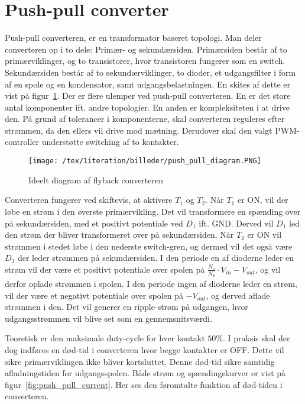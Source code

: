 \section{Push-pull converter}
Push-pull converteren, er en transformator baseret topologi. Man deler converteren op i to dele: Primær- og sekundærsiden. Primærsiden består af to primærviklinger, og to transistorer, hvor transistoren fungerer som en switch. Sekundærsiden består af to sekundærviklinger, to dioder, et udgangsfilter i form af en spole og en kondensator, samt udgangsbelastningen. En skites af dette er vist på figur~\ref{fig:push_pull_ideal}. Der er flere ulemper ved push-pull converteren. En er det store antal komponenter ift. andre topologier. En anden er kompleksiteten i at drive den. På grund af tolerancer i komponenterne, skal converteren reguleres efter strømmen, da den ellers vil drive mod mætning. Derudover skal den valgt PWM-controller understøtte switching af to kontakter. 

\begin{figure}[H]
	\center
	\texttt{[image: /tex/1iteration/billeder/push\_pull\_diagram.PNG]}
	\caption{Ideelt diagram af flyback converteren
		\cite{SMPS-topologies}}
	\label{fig:push_pull_ideal}
\end{figure} 

\noindent Converteren fungerer ved skiftevis, at aktivere $T_1$ og $T_2$. Når $T_1$ er ON, vil der løbe en strøm i den øverste primærvikling. Det vil transformere en spænding over på sekundærsiden, med et positivt potentiale ved $D_1$ ift. GND. Derved vil $D_1$ led den strøm der bliver transformeret over på sekundærsiden. Når $T_2$ er ON vil strømmen i stedet løbe i den nederste switch-gren, og dermed vil det også være $D_2$ der leder strømmen på sekundærsiden. I den periode en af dioderne leder en strøm vil der være et positivt potentiale over spolen på $\frac{N_s}{N_p} \cdot V_{in} - V_{out}$, og vil derfor oplade strømmen i spolen. I den periode ingen af dioderne leder en strøm, vil der være et negativt potentiale over spolen på $-V_{out}$, og derved aflade strømmen i den. Det vil generer en ripple-strøm på udgangen, hvor udgangsstrømmen vil blive set som en gennemsnitsværdi. 

Teoretisk er den maksimale duty-cycle for hver kontakt $50\percent$. I praksis skal der dog indføres en død-tid i converteren hvor begge kontakter er OFF. Dette vil sikre primærviklingen ikke bliver kortsluttet. Denne død-tid sikre samtidig afladningstiden for udgangsspolen. Både strøm og spændingskurver er vist på figur~\ref{fig:push_pull_current}. Her ses den føromtalte funktion af død-tiden i converteren. 

